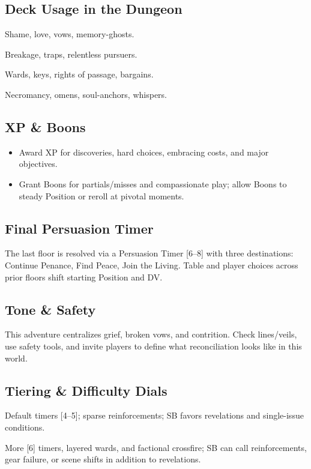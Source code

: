 \documentclass[18pt, letterpaper, twoside]{article}
\begin{document}
\subsection{Deck Usage in the Dungeon}
\begin{description}[leftmargin=*, labelwidth=3cm, style=standard]
    \item[Hearts:] Shame, love, vows, memory-ghosts.
    \item[Clubs:] Breakage, traps, relentless pursuers.
    \item[Diamonds:] Wards, keys, rights of passage, bargains.
    \item[Spades:] Necromancy, omens, soul-anchors, whispers.
\end{description}

\subsection{XP \& Boons}
\begin{itemize}[leftmargin=*]
    \item Award XP for discoveries, hard choices, embracing costs, and major objectives.
    \item Grant Boons for partials/misses and compassionate play; allow Boons to steady Position or reroll at pivotal moments.
\end{itemize}

\subsection{Final Persuasion Timer }
The last floor is resolved via a Persuasion Timer [6--8] with three destinations: Continue Penance, Find Peace, Join the Living. Table and player choices across prior floors shift starting Position and DV.

\subsection{Tone \& Safety}
This adventure centralizes grief, broken vows, and contrition. Check lines/veils, use safety tools, and invite players to define what reconciliation looks like in this world.

\subsection{Tiering \& Difficulty Dials}
\begin{description}[leftmargin=*, labelwidth=4cm, style=standard]
    \item[Party Tier I--II:] Default timers [4--5]; sparse reinforcements; SB favors revelations and single-issue conditions.
    \item[Tier III+:] More [6] timers, layered wards, and factional crossfire; SB can call reinforcements, gear failure, or scene shifts in addition to revelations.
\end{description}
\end{document}
